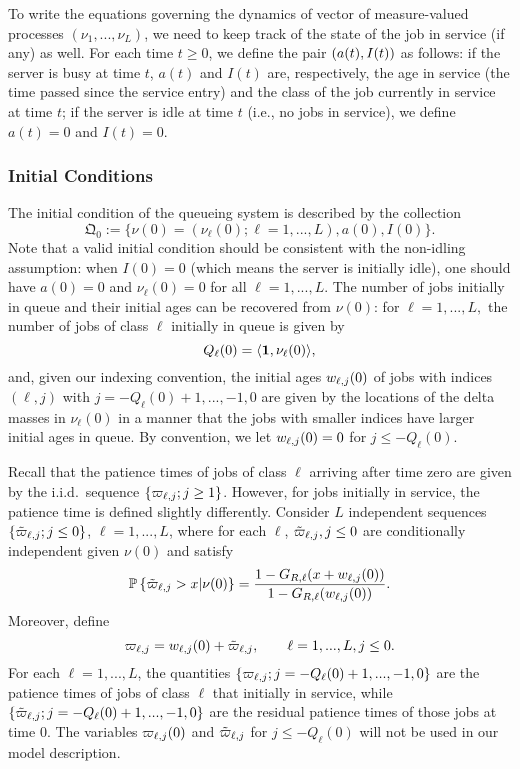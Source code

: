 \documentclass{article}
\theoremstyle{definition}
\numberwithin{equation}{section}
\begin{document}
To write the equations governing the dynamics of vector of measure-valued processes $(\nu_1,...,\nu_L)$, we need to keep track of the state of the job in service (if any) as well. For each time $t\geq0$, we define the pair $(a(t),I(t))$ as follows: if the server is busy at time $t$, $a(t)$ and $I(t)$ are, respectively, the age in service (the time passed since the service entry) and the class of the job currently in service at time $t$; if the server is idle at time $t$ (i.e., no jobs in service), we define $a(t)=0$ and $I(t)=0$. 

\subsubsection*{Initial Conditions}
The initial condition of the queueing system is described by the collection
\begin{equation}\label{ic}
\mathfrak{Q}_0:=\{\nu(0)=(\nu_\ell(0);\ell=1,...,L),a(0),I(0)\}.
\end{equation}
Note that a valid initial condition should be consistent with the non-idling assumption: when $I(0)=0$ (which means the server is initially idle), one should have $a(0)=0$ and $\nu_\ell(0)=0$ for all $\ell=1,...,L$. The number of jobs initially in queue and their initial ages can be recovered from $\nu(0)$: for $\ell=1,...,L,$ the number of jobs of class $\ell$ initially in queue is given by 
\begin{equation}\label{QLzero}
Q_\ell(0)=\langle\f1,\nu_\ell(0) \rangle,
\end{equation}
and, given our indexing convention, the initial ages $w_{\ell,j}(0)$ of jobs with indices $(\ell,j)$ with $j=-Q_\ell(0)+1,...,-1,0$ are given by the locations of the delta masses in $\nu_\ell(0)$ in a manner that the jobs with smaller indices have larger initial ages in queue. By convention, we let $w_{\ell,j}(0)=0$ for $j\leq -Q_\ell(0)$.

Recall that the patience times of jobs of class $\ell$ arriving after time zero are given by the i.i.d.\ sequence $\{\varpi_{\ell,j}; j\geq1\}$. However, for jobs initially in service, the patience time is defined slightly differently. Consider $L$ independent sequences $\{\tilde{\varpi}_{\ell,j};j\leq 0\}$, $\ell=1,...,L$, where for each $\ell$, $\tilde{\varpi}_{\ell,j},j\leq0$ are conditionally independent given $\nu(0)$ and satisfy
\[
\mathbb{P}\left\{\tilde{\varpi}_{\ell,j}>x|\nu(0)\right\}=\frac{1- G_{R,\ell}(x+w_{\ell,j}(0))}{1- G_{R,\ell}(w_{\ell,j}(0))}. 
\]
Moreover, define 
\begin{equation}\label{def_initial_age}
\varpi_{\ell,j}=w_{\ell,j}(0)+\tilde{\varpi}_{\ell,j},\quad\quad \ell=1,...,L,j\leq 0.
\end{equation}
For each $\ell=1,...,L$, the quantities $\{\varpi_{\ell,j};j=-Q_\ell(0)+1,...,-1,0\}$ are the patience times of jobs of class $\ell$ that initially in service, while $\{\tilde{\varpi}_{\ell,j};j=-Q_\ell(0)+1,...,-1,0\}$ are the residual patience times of those jobs at time $0$. The variables $\varpi_{\ell,j}(0)$ and $\tilde {\varpi}_{\ell,j}$ for $j\leq -Q_\ell(0)$ will not be used in our model description. 
\end{document}
